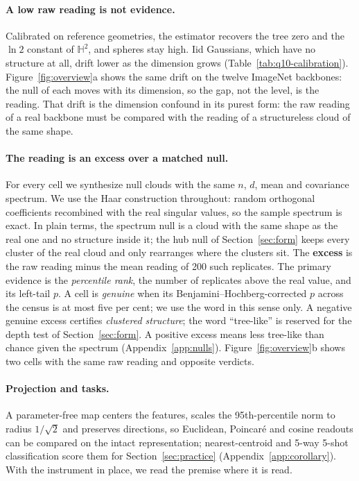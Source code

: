 \documentclass{article} %
\begin{document}
\paragraph{A low raw reading is not evidence.} Calibrated on reference geometries, the estimator recovers the tree zero and the $\ln 2$ constant of $\mathbb{H}^2$, and spheres stay high. Iid Gaussians, which have no structure at all, drift lower as the dimension grows (Table~\ref{tab:q10-calibration}). Figure~\ref{fig:overview}a shows the same drift on the twelve ImageNet backbones: the null of each moves with its dimension, so the gap, not the level, is the reading. That drift is the dimension confound in its purest form: the raw reading of a real backbone must be compared with the reading of a structureless cloud of the same shape.

\paragraph{The reading is an excess over a matched null.} For every cell we synthesize null clouds with the same $n$, $d$, mean and covariance spectrum. We use the Haar construction throughout: random orthogonal coefficients recombined with the real singular values, so the sample spectrum is exact. In plain terms, the spectrum null is a cloud with the same shape as the real one and no structure inside it; the hub null of Section~\ref{sec:form} keeps every cluster of the real cloud and only rearranges where the clusters sit. The \textbf{excess} is the raw reading minus the mean reading of 200 such replicates. The primary evidence is the \emph{percentile rank}, the number of replicates above the real value, and its left-tail $p$. A cell is \emph{genuine} when its Benjamini--Hochberg-corrected $p$ across the census is at most five per cent; we use the word in this sense only. A negative genuine excess certifies \emph{clustered structure}; the word ``tree-like'' is reserved for the depth test of Section~\ref{sec:form}. A positive excess means less tree-like than chance given the spectrum (Appendix~\ref{app:nulls}). Figure~\ref{fig:overview}b shows two cells with the same raw reading and opposite verdicts.


\paragraph{Projection and tasks.} A parameter-free map centers the features, scales the 95th-percentile norm to radius $1/\sqrt2$ and preserves directions, so Euclidean, Poincar\'{e} and cosine readouts can be compared on the intact representation; nearest-centroid and 5-way 5-shot classification score them for Section~\ref{sec:practice} (Appendix~\ref{app:corollary}). With the instrument in place, we read the premise where it is read.
\end{document}
